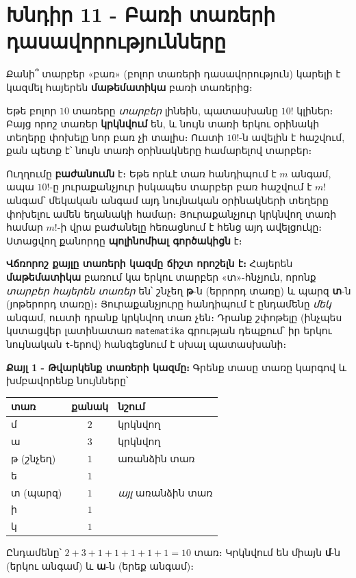 \documentclass[11pt,a4paper]{article}
\begin{document}
\section*{Խնդիր 11 - Բառի տառերի դասավորությունները}

\begin{problembox}[11]
Քանի՞ տարբեր «բառ» (բոլոր տառերի դասավորություն) կարելի է կազմել հայերեն \textbf{մաթեմատիկա} բառի
տառերից։
\end{problembox}

\begin{ideabox}
Եթե բոլոր $10$ տառերը \emph{տարբեր} լինեին, պատասխանը $10!$ կլիներ։ Բայց որոշ տառեր
\textbf{կրկնվում} են, և նույն տառի երկու օրինակի տեղերը փոխելը նոր բառ չի տալիս։ Ուստի
$10!$-ն ավելին է հաշվում, քան պետք է՝ նույն տառի օրինակները համարելով տարբեր։

Ուղղումը \textbf{բաժանումն} է։ Եթե որևէ տառ հանդիպում է $m$ անգամ, ապա $10!$-ը յուրաքանչյուր
իսկապես տարբեր բառ հաշվում է $m!$ անգամ՝ մեկական անգամ այդ նույնական օրինակների տեղերը փոխելու
ամեն եղանակի համար։ Յուրաքանչյուր կրկնվող տառի համար $m!$-ի վրա բաժանելը հեռացնում է հենց այդ
ավելցուկը։ Ստացվող քանորդը \textbf{պոլինոմիալ գործակիցն} է։

\textbf{Վճռորոշ քայլը տառերի կազմը ճիշտ որոշելն է։} Հայերեն \textbf{մաթեմատիկա} բառում կա երկու
տարբեր «տ»-հնչյուն, որոնք \emph{տարբեր հայերեն տառեր} են՝ շնչեղ \textbf{թ}-ն (երրորդ տառը) և պարզ
\textbf{տ}-ն (յոթերորդ տառը)։ Յուրաքանչյուրը հանդիպում է ընդամենը \emph{մեկ} անգամ, ուստի դրանք
կրկնվող տառ չեն։ Դրանք շփոթելը (ինչպես կստացվեր լատինատառ \texttt{matematika} գրության դեպքում՝
իր երկու նույնական \texttt{t}-երով) հանգեցնում է սխալ պատասխանի։
\end{ideabox}

\textbf{Քայլ 1 - Թվարկենք տառերի կազմը։}
Գրենք տասը տառը կարգով և խմբավորենք նույնները՝
\begin{center}
\small
\begin{tabular}{@{}lcl@{}}
\toprule
տառ & քանակ & նշում\\
\midrule
մ  & $2$ & կրկնվող\\
ա  & $3$ & կրկնվող\\
թ (շնչեղ) & $1$ & առանձին տառ\\
ե  & $1$ &\\
տ (պարզ) & $1$ & \emph{այլ} առանձին տառ\\
ի  & $1$ &\\
կ  & $1$ &\\
\bottomrule
\end{tabular}
\end{center}
Ընդամենը՝ $2+3+1+1+1+1+1=10$ տառ։ Կրկնվում են միայն \textbf{մ}-ն (երկու անգամ) և \textbf{ա}-ն
(երեք անգամ)։
\end{document}
